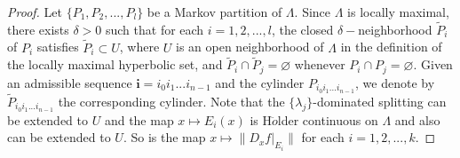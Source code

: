 \documentclass[11pt,a4paper]{amsart}
\theoremstyle{plain}
\theoremstyle{remark}
\begin{document}
	
	\iffalse
	\begin{proof}
		Let $\{P_{1},P_{2},...,P_{l}\}$ be a Markov partition of $\Lambda$. Since $\Lambda$ is locally maximal, there exists $\delta>0$ such that for each $i=1,2,...,l$, the closed $\delta-$neighborhood $\tilde{P}_{i}$ of $P_{i}$ satisfies $\tilde{P}_{i}\subset U$, where $U$ is an open neighborhood of $\Lambda$  in the definition of the locally maximal hyperbolic set, and $\tilde{P}_{i}\cap \tilde{P}_{j}=\varnothing$ whenever $P_{i}\cap P_{j}=\varnothing$. Given an admissible sequence $\mathbf{i}=i_{0}i_{1}...i_{n-1}$ and the cylinder $P_{i_{0}i_{1}...i_{n-1}}$, we denote by $\tilde{P}_{i_{0}i_{1}...i_{n-1}}$ the corresponding cylinder. Note that the $\{\lambda_{j}\}$-dominated splitting can be extended to $U$ and the map $x\mapsto E_{i}(x)$ is H$\ddot{o}$lder continuous on $\Lambda$ and also can be extended to $U$. So is the map $x\mapsto \|D_{x}f|_{E_{i}}\|$ for each $i=1,2,...,k.$
		

\end{proof}
\end{document}

